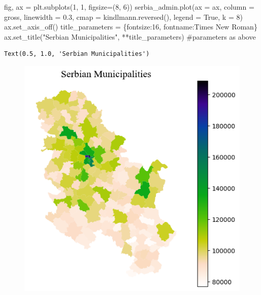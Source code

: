\documentclass[
  letterpaper,
  DIV=11,
  numbers=noendperiod]{scrreprt}
\newenvironment{Shaded}{\begin{snugshade}}{\end{snugshade}}
\newcommand{\BuiltInTok}[1]{\textcolor[rgb]{0.00,0.23,0.31}{#1}}
\newcommand{\CommentTok}[1]{\textcolor[rgb]{0.37,0.37,0.37}{#1}}
\newcommand{\DecValTok}[1]{\textcolor[rgb]{0.68,0.00,0.00}{#1}}
\newcommand{\FloatTok}[1]{\textcolor[rgb]{0.68,0.00,0.00}{#1}}
\newcommand{\NormalTok}[1]{\textcolor[rgb]{0.00,0.23,0.31}{#1}}
\newcommand{\OperatorTok}[1]{\textcolor[rgb]{0.37,0.37,0.37}{#1}}
\newcommand{\StringTok}[1]{\textcolor[rgb]{0.13,0.47,0.30}{#1}}
\newcommand{\VariableTok}[1]{\textcolor[rgb]{0.07,0.07,0.07}{#1}}
\begin{document}
\begin{Shaded}
\begin{Highlighting}[]
\NormalTok{fig, ax }\OperatorTok{=}\NormalTok{ plt.subplots(}\DecValTok{1}\NormalTok{, }\DecValTok{1}\NormalTok{, figsize}\OperatorTok{=}\NormalTok{(}\DecValTok{8}\NormalTok{, }\DecValTok{6}\NormalTok{))}
\NormalTok{serbia\_admin.plot(ax }\OperatorTok{=}\NormalTok{ ax, column }\OperatorTok{=} \StringTok{\textquotesingle{}gross\textquotesingle{}}\NormalTok{, linewidth }\OperatorTok{=} \FloatTok{0.3}\NormalTok{, cmap }\OperatorTok{=}\NormalTok{ kindlmann.}\BuiltInTok{reversed}\NormalTok{(), legend }\OperatorTok{=} \VariableTok{True}\NormalTok{, k }\OperatorTok{=} \DecValTok{8}\NormalTok{)}
\NormalTok{ax.set\_axis\_off()}
\NormalTok{title\_parameters }\OperatorTok{=}\NormalTok{ \{}\StringTok{\textquotesingle{}fontsize\textquotesingle{}}\NormalTok{:}\StringTok{\textquotesingle{}16\textquotesingle{}}\NormalTok{, }\StringTok{\textquotesingle{}fontname\textquotesingle{}}\NormalTok{:}\StringTok{\textquotesingle{}Times New Roman\textquotesingle{}}\NormalTok{\}}
\NormalTok{ax.set\_title(}\StringTok{"Serbian Municipalities"}\NormalTok{, }\OperatorTok{**}\NormalTok{title\_parameters) }\CommentTok{\#parameters as above}
\end{Highlighting}
\end{Shaded}

\begin{verbatim}
Text(0.5, 1.0, 'Serbian Municipalities')
\end{verbatim}

\begin{figure}[H]

{\centering \includegraphics{labs/w02_maps_files/figure-pdf/cell-33-output-2.png}

}

\end{figure}
\end{document}
